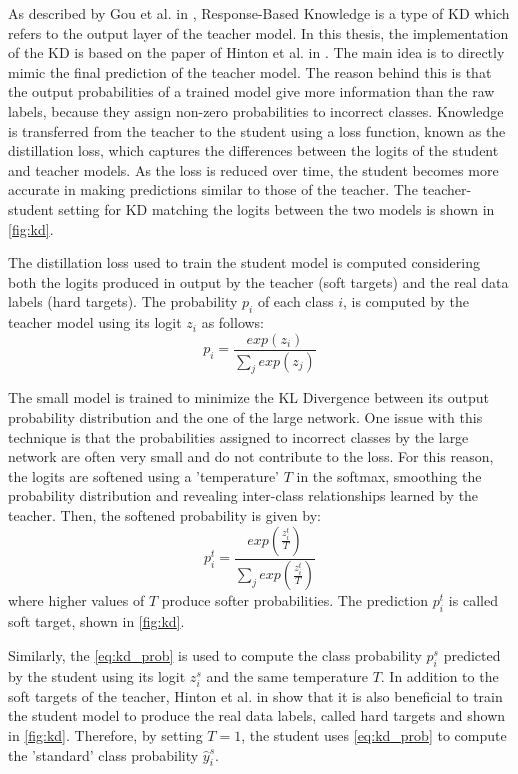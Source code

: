 As described by Gou et al. in \cite{gou2021knowledge},
Response-Based Knowledge is a type of KD which refers to the output layer of the teacher model.
In this thesis, the implementation of the KD is based on the paper of Hinton et al. in \cite{hinton2015distilling}.
The main idea is to directly mimic the final prediction
of the teacher model.
The reason behind this is that the output probabilities of a trained model give more information than the raw labels, because they assign non-zero probabilities to incorrect classes.
Knowledge is transferred from the teacher to the student using a loss function, known as the distillation loss, which captures the differences between the logits of the student and teacher models.
As the loss is reduced over time, the student becomes more accurate in making predictions similar to those of the teacher.
The teacher-student setting for KD matching the logits between the two models is shown in \autoref{fig:kd}.

The distillation loss used to train the student model is computed considering both the logits produced in output by the teacher (soft targets) and the real data labels (hard targets).
The probability $p_i$ of each class $i$, is computed by the teacher model using its logit $z_i$ as follows:
\begin{equation}
    p_i = \frac{exp(z_i)}{\sum_j exp(z_j)}
\end{equation}

The small model is trained to minimize the KL Divergence between its output probability distribution and the one of the large network.
One issue with this technique is that the probabilities assigned to incorrect classes by the large network are often very small and do not contribute to the loss.
For this reason, the logits are softened using a 'temperature' $T$ in the softmax, smoothing the probability distribution and revealing inter-class relationships learned by the teacher.
Then, the softened probability is given by:
\begin{equation}\label{eq:kd_prob}
    p_i^t = \frac{exp(\frac{z_i^t}{T})}{\sum_j exp(\frac{z_i^t}{T})}
\end{equation}
where higher values of $T$ produce softer probabilities. The prediction $p_i^t$ is called soft target, shown in \autoref{fig:kd}.

Similarly, the \autoref{eq:kd_prob} is used to compute the class probability $p_i^s$ predicted by the student using its logit $z_i^s$ and the same temperature $T$.
In addition to the soft targets of the teacher, Hinton et al. in \cite{hinton2015distilling} show that it is also beneficial to train the student model to produce the real data labels, called hard targets and shown in \autoref{fig:kd}.
Therefore, by setting $T = 1$, the student uses \autoref{eq:kd_prob} to compute the 'standard' class probability $\hat{y}_i^s$.

